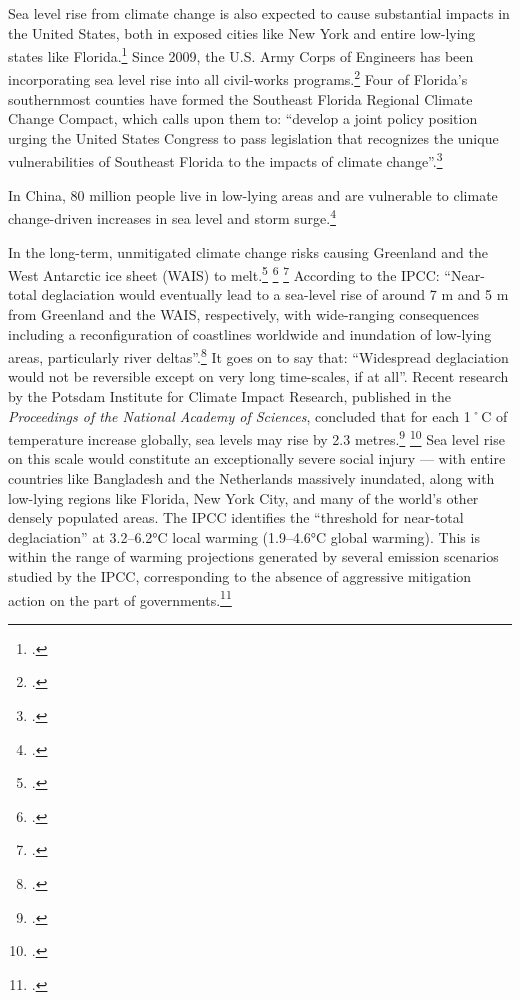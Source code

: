Sea level rise from climate change is also expected to cause substantial impacts in the United States, both in exposed cities like New York and entire low-lying states like Florida.\footcite[][]{EconGetWet}
Since 2009, the U.S. Army Corps of Engineers has been incorporating sea level rise into all civil-works programs.\footcite[][]{CorpsEngSeaLevel}
Four of Florida's southernmost counties have formed the Southeast Florida Regional Climate Change Compact, which calls upon them to: ``develop a joint policy position urging the United States Congress to pass legislation that recognizes the unique vulnerabilities of Southeast Florida to the impacts of climate change''.\footcite[][]{SouthEastFloridaCompact}



In China, 80 million people live in low-lying areas and are vulnerable to climate change-driven increases in sea level and storm surge.\footcite[][p. 19]{EastGrey2013}



In the long-term, unmitigated climate change risks causing Greenland and the West Antarctic ice sheet (WAIS) to melt.\footcite[See: ][]{Goelzer2013} \footcite[][]{GreenlandContribution2013} \footcite[][]{Nghiem2012}
According to the IPCC: ``Near-total deglaciation would eventually lead to a sea-level rise of around 7 m and 5 m from Greenland and the WAIS, respectively, with wide-ranging consequences including a reconfiguration of coastlines worldwide and inundation of low-lying areas, particularly river deltas''.\footcite[][See: "Deglaciation of West Antarctic and Greenland ice sheets" \url{https://www.ipcc.ch/publications_and_data/ar4/wg2/en/ch19s19-3-5-2.html}]{IPCC2007}
It goes on to say that: ``Widespread deglaciation would not be reversible except on very long time-scales, if at all''.
Recent research by the Potsdam Institute for Climate Impact Research, published in the \emph{Proceedings of the National Academy of Sciences}, concluded that for each 1˚C of temperature increase globally, sea levels may rise by 2.3 metres.\footcite[][]{PotsdamSeaLevelReport} \footcite[See also: ][]{TwoPointThreeMetres}
Sea level rise on this scale would constitute an exceptionally severe social injury --- with entire countries like Bangladesh and the Netherlands massively inundated, along with low-lying regions like Florida, New York City, and many of the world's other densely populated areas.
The IPCC identifies the ``threshold for near-total deglaciation'' at 3.2--6.2°C local warming (1.9--4.6°C global warming).
This is within the range of warming projections generated by several emission scenarios studied by the IPCC, corresponding to the absence of aggressive mitigation action on the part of governments.\footcite[][See: "Projected climate change an its impacts" \url{https://www.ipcc.ch/publications_and_data/ar4/syr/en/spms3.html}"]{IPCC2007}



